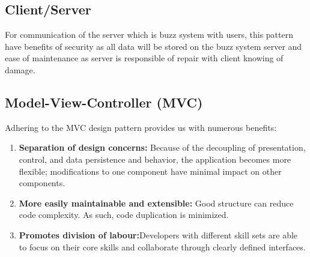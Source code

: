 \subsection*{Client/Server} 
For communication of the server which is buzz system with users, this pattern have benefits of security as all data will be stored on the buzz system server and ease of maintenance as server is responsible of repair with client knowing of damage.


\subsection*{Model-View-Controller (MVC)}

\begin{flushleft}

Adhering to the MVC design pattern provides us with numerous benefits:

\begin{enumerate}
	\item \textbf{Separation of design concerns:} Because of the decoupling of presentation, control, and data persistence and behavior, the application becomes more flexible; modifications to one component have minimal impact on other components.
	\item \textbf{More easily maintainable and extensible:} Good structure can reduce code complexity. As such, code duplication is minimized.
	\item \textbf{Promotes division of labour:}Developers with different skill sets are able to focus on their core skills and collaborate through clearly defined interfaces.
\end{enumerate}


\end{flushleft}
